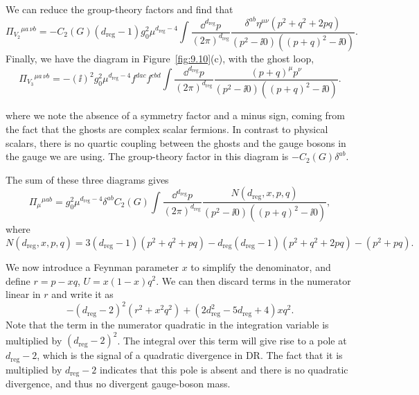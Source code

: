 We can reduce the group-theory factors and find that
\begin{equation}
  \Pi_{V_2}{}^{\mu a\,\nu b}
  =-C_2(G)(d_{\mathrm{reg}}-1)g_0^2\mu^{d_{\mathrm{reg}}-4}
  \int\frac{\dd^{d_{\mathrm{reg}}}p}{(2\pi)^{d_{\mathrm{reg}}}}
  \frac{\delta^{ab}\eta^{\mu\nu}(p^2+q^2+2pq)}{(p^2-\ii0)((p+q)^2-\ii0)}.
\label{eq:9.11}
\end{equation}
Finally, we have the diagram in Figure~\ref{fig:9.10}(c), with the ghost loop,
\begin{equation}
  \Pi_{V_3}{}^{\mu a\,\nu b}
  =-(\ii)^2g_0^2\mu^{d_{\mathrm{reg}}-4}f^{dac}f^{cbd}
  \int\frac{\dd^{d_{\mathrm{reg}}}p}{(2\pi)^{d_{\mathrm{reg}}}}
  \frac{(p+q)^\mu p^\nu}{(p^2-\ii0)((p+q)^2-\ii0)}.
\label{eq:9.12}
\end{equation}

where we note the absence of a symmetry factor and a minus sign, coming from
the fact that the ghosts are complex scalar fermions. In contrast to physical
scalars, there is no quartic coupling between the ghosts and the gauge bosons
in the gauge we are using. The group-theory factor in this diagram is
$-C_2(G)\delta^{ab}$.

The sum of these three diagrams gives
\[
  \Pi_\mu{}^{\mu ab}=g_0^2\mu^{d_{\mathrm{reg}}-4}\delta^{ab}C_2(G)
  \int\frac{\dd^{d_{\mathrm{reg}}}p}{(2\pi)^{d_{\mathrm{reg}}}}
  \frac{N(d_{\mathrm{reg}},x,p,q)}{(p^2-\ii0)((p+q)^2-\ii0)},
\]
where
\[
  N(d_{\mathrm{reg}},x,p,q)=3(d_{\mathrm{reg}}-1)(p^2+q^2+pq)
  -d_{\mathrm{reg}}(d_{\mathrm{reg}}-1)(p^2+q^2+2pq)-(p^2+pq).
\]

We now introduce a Feynman parameter $x$ to simplify the denominator, and
define $r=p-xq$, $U=x(1-x)q^2$. We can then discard terms in the numerator
linear in $r$ and write it as
\[
  -(d_{\mathrm{reg}}-2)^2(r^2+x^2q^2)
  +(2d_{\mathrm{reg}}^2-5d_{\mathrm{reg}}+4)xq^2.
\]
Note that the term in the numerator quadratic in the integration variable is
multiplied by $(d_{\mathrm{reg}}-2)^2$. The integral over this term will give rise to a pole at
$d_{\mathrm{reg}}-2$, which is the signal of a quadratic divergence in DR. The fact that it is
multiplied by $d_{\mathrm{reg}}-2$ indicates that this pole is absent and there is no
quadratic divergence, and thus no divergent gauge-boson mass.


